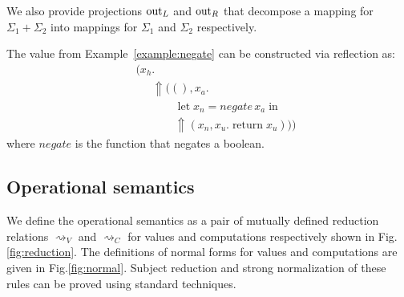 \documentclass[acmsmall, screen, review, anonymous]{acmart}
\theoremstyle{definition}
\newcommand{\reflectname}{\Uparrow}
\newcommand{\performraw}[2]{\mathop{\reflectname(#1(#2))}}
\newcommand{\perform}[5]{\performraw{#1}{#2}(#3, #4. #5)}
\newcommand{\reifyname}{\Downarrow}
\newcommand{\reifyraw}[1]{\mathop{\reifyname_{#1}}}
\newcommand{\reify}[3]{\reifyraw{#1}(#2.\,#3)}
\newcommand{\outlname}{\mathrm{out}_L}
\newcommand{\outl}[1]{\mathop{\outlname} #1}
\newcommand{\outrname}{\mathrm{out}_R}
\newcommand{\outr}[1]{\mathop{\outrname} #1}
\newcommand{\app}[2]{#1\,#2}
\newcommand{\return}[1]{\mathop{\mathrm{return}} #1}
\newcommand{\letv}[3]{\mathop{\mathrm{let}} #1 = #2 \mathop{\mathrm{in}} #3}
\newcommand{\reducestov}{\rightsquigarrow_V}
\newcommand{\reducestoc}{\rightsquigarrow_C}
\begin{document}
We also provide projections $\outl$ and $\outr$ that decompose a mapping
for $\Sigma_1 + \Sigma_2$ into mappings for $\Sigma_1$ and $\Sigma_2$
respectively.

\begin{example}
  The value from Example~\ref{example:negate} can be constructed via reflection as:
  \begin{align*}
    &\reify{\Sigma_{bs}}{x_h}{\\
      &\qquad \perform{x_h}{get}{()}{x_a}{\\
        &\qquad \qquad \letv{x_n}{\app{\mathit{negate}}{x_a}}{\\
          &\qquad \qquad \perform{x_h}{set}{x_n}{x_u}{\return{x_u}}}}}
  \end{align*}
  where $\mathit{negate}$ is the function that negates a boolean.
\end{example}


\subsection{Operational semantics}
\label{sec:operational}

We define the operational semantics as a pair of mutually defined
reduction relations $\reducestov$ and $\reducestoc$ for values and
computations respectively shown in Fig.\ref{fig:reduction}. The
definitions of normal forms for values and computations are given in
Fig.\ref{fig:normal}. Subject reduction and strong normalization of
these rules can be proved using standard techniques.
\end{document}
